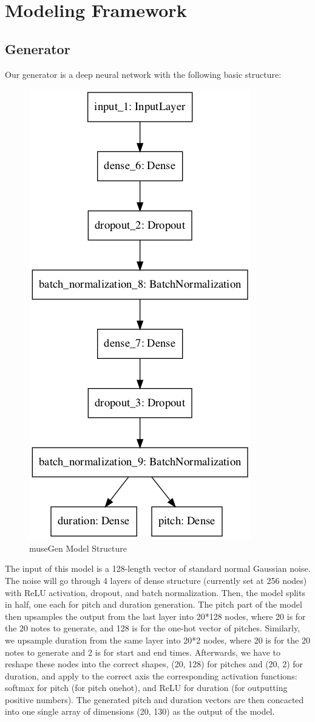 \documentclass[12pt,oneside]{chicagocapstone}
\begin{document}
\newpage

\hypertarget{methodology-modeling}{%
\section*{Modeling Framework}\label{methodology-modeling}}

\hypertarget{generator}{%
\subsection*{Generator}\label{generator}}

Our generator is a deep neural network with the following basic structure:
\begin{figure}

{\centering \includegraphics[width=0.3\linewidth]{figure/model_terryjosh} 

}

\caption{museGen Model Structure}\label{fig:unnamed-chunk-1}
\end{figure}
The input of this model is a 128-length vector of standard normal Gaussian noise. The noise will go through 4 layers of dense structure (currently set at 256 nodes) with ReLU activation, dropout, and batch normalization. Then, the model splits in half, one each for pitch and duration generation. The pitch part of the model then upsamples the output from the last layer into 20*128 nodes, where 20 is for the 20 notes to generate, and 128 is for the one-hot vector of pitches. Similarly, we upsample duration from the same layer into 20*2 nodes, where 20 is for the 20 notes to generate and 2 is for start and end times. Afterwards, we have to reshape these nodes into the correct shapes, (20, 128) for pitches and (20, 2) for duration, and apply to the correct axis the corresponding activation functions: softmax for pitch (for pitch onehot), and ReLU for duration (for outputting positive numbers). The generated pitch and duration vectors are then concacted into one single array of dimensions (20, 130) as the output of the model.
\end{document}

